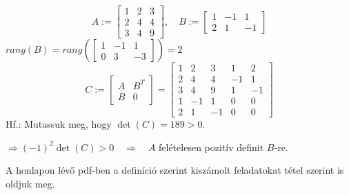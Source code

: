 \documentclass[a4paper,11.5pt]{article}
\begin{document}
	\begin{example}
		\[ A:=\begin{bmatrix}
			1&2&3\\
			2&4&4\\
			3&4&9
		\end{bmatrix},\quad B:=\begin{bmatrix}
			1&-1&1\\
			2&1&-1
		\end{bmatrix} \]
		$rang(B)=rang\left(\begin{bmatrix}
			1&-1&1\\
			0&3&-3
		\end{bmatrix}\right)=2$
		\[ C:=\begin{bmatrix}
			A&B^T\\
			B&0
		\end{bmatrix}=\begin{bmatrix}
			1&2&3&1&2\\
			2&4&4&-1&1\\
			3&4&9&1&-1\\
			1&-1&1&0&0\\
			2&1&-1&0&0
		\end{bmatrix} \]
		Hf.: Mutassuk meg, hogy $\det(C)=189>0$.
		
		$\Rightarrow (-1)^2\det(C)>0\quad \Rightarrow\quad A$ felételesen pozitív definit $B$-re.
	\end{example}
	\begin{exercise}
		A honlapon lévő pdf-ben a definíció szerint kiszámolt feladatokat tétel szerint is oldjuk meg.
	\end{exercise}
\end{document}
